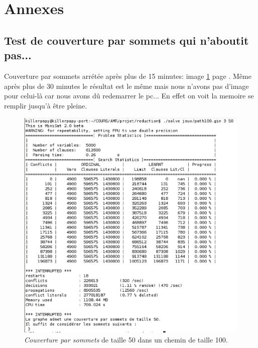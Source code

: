  \section{Annexes}
  \subsection{Test de couverture par sommets qui n'aboutit pas...\label{an1}}
  Couverture par sommets arrétée après plus de 15 minutes: image
  \ref{lourd} page \pageref{lourd}. Même après plus de 30 minutes le
  résultat est le même mais nous n'avons pas d'image pour celui-là car
  nous avons dû redemarrer le pc... En effet on voit la memoire se
  remplir jusqu'à être pleine.

  \begin{figure}[!ht]
   \begin{center}
    \includegraphics[width=12cm]{images/couv100.eps}
    \caption{\emph{Couverture par sommets} de taille 50 dans un chemin
    de taille 100.\label{lourd}}
   \end{center}
  \end{figure}

  \newpage

